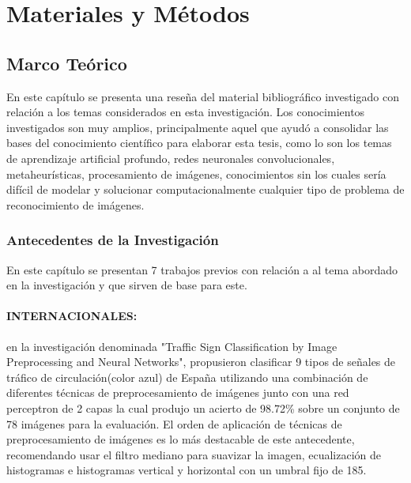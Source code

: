 \chapter{Materiales y Métodos}
\setcounter{page}{20}
\renewcommand{\baselinestretch}{1.2} %

\section{Marco Teórico} 

En este capítulo se presenta una reseña del material bibliográfico investigado con relación a los temas considerados en esta investigación. Los conocimientos investigados son muy amplios, principalmente aquel que ayudó a consolidar las bases del conocimiento científico para elaborar esta tesis, como lo son los temas de aprendizaje artificial profundo, redes neuronales convolucionales, metaheurísticas, procesamiento de imágenes, conocimientos sin los cuales sería difícil de modelar y solucionar computacionalmente cualquier tipo de problema de reconocimiento de imágenes.

\subsection{Antecedentes de la Investigación}

	En este capítulo se presentan 7 trabajos previos con relación a al tema abordado en la investigación y que sirven de base para este.
	\vskip 0.4cm

	\subsubsection
	{INTERNACIONALES:}
		\citep{VicenBueno2007} en la investigación denominada "Traffic Sign Classification by Image Preprocessing and Neural Networks", propusieron clasificar 9 tipos de señales de tráfico de circulación(color azul) de España utilizando una combinación de diferentes técnicas de preprocesamiento de imágenes junto con una red perceptron de 2 capas la cual produjo un acierto de 98.72\% sobre un conjunto de 78 imágenes para la evaluación. El orden de aplicación de técnicas de preprocesamiento de imágenes es lo más destacable de este antecedente, recomendando usar el filtro mediano para suavizar la imagen, ecualización de histogramas e histogramas vertical y horizontal con un umbral fijo de 185.
		\vskip 0.4cm

